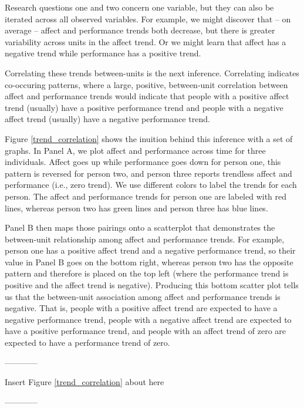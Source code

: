 \documentclass[english,,man]{apa6}
\theoremstyle{definition}
\theoremstyle{definition}
\theoremstyle{definition}
\theoremstyle{remark}
\begin{document}
Research questions one and two concern one variable, but they can also
be iterated across all observed variables. For example, we might
discover that -- on average -- affect and performance trends both
decrease, but there is greater variability across units in the affect
trend. Or we might learn that affect has a negative trend while
performance has a positive trend.

Correlating these trends between-units is the next inference.
Correlating indicates co-occuring patterns, where a large, positive,
between-unit correlation between affect and performance trends would
indicate that people with a positive affect trend (usually) have a
positive performance trend and people with a negative affect trend
(usually) have a negative performance trend.

Figure \ref{trend_correlation} shows the inuition behind this inference
with a set of graphs. In Panel A, we plot affect and performance across
time for three individuals. Affect goes up while performance goes down
for person one, this pattern is reversed for person two, and person
three reports trendless affect and performance (i.e., zero trend). We
use different colors to label the trends for each person. The affect and
performance trends for person one are labeled with red lines, whereas
person two has green lines and person three has blue lines.

Panel B then maps those pairings onto a scatterplot that demonstrates
the between-unit relationship among affect and performance trends. For
example, person one has a positive affect trend and a negative
performance trend, so their value in Panel B goes on the bottom right,
whereas person two has the opposite pattern and therefore is placed on
the top left (where the performance trend is positive and the affect
trend is negative). Producing this bottom scatter plot tells us that the
between-unit association among affect and performance trends is
negative. That is, people with a positive affect trend are expected to
have a negative performance trend, people with a negative affect trend
are expected to have a positive performance trend, and people with an
affect trend of zero are expected to have a performance trend of zero.

\begin{center}

------------

Insert Figure \ref{trend_correlation} about here

------------

\end{center}
\end{document}
